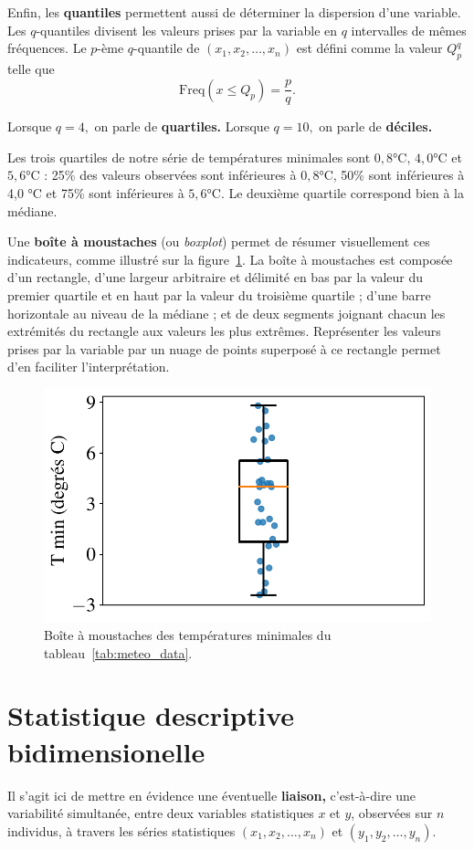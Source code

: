 Enfin, les \textbf{quantiles} permettent aussi de déterminer la dispersion
d'une variable. Les $q$-quantiles divisent les valeurs prises par la variable
en $q$ intervalles de mêmes fréquences. Le $p$-ème $q$-quantile de
$(x_1, x_2, \dots, x_n)$ est défini comme la valeur $Q_p^q$ telle que 
\[\text{Freq}(x \leq Q_p) = \frac{p}{q}.\]

Lorsque $q=4,$ on parle de \textbf{quartiles.} Lorsque $q=10,$ on parle de
\textbf{déciles.}

\begin{exemple}
  Les trois quartiles de notre série de températures minimales sont
  $0,8 \si{\celsius}$, $4,0 \si{\celsius}$ et $5,6 \si{\celsius}$ : 25\% des
  valeurs observées sont inférieures à $0,8 \si{\celsius}$, 50\% sont inférieures
  à 4,0 \si{\celsius} et 75\% sont inférieures à $5,6 \si{\celsius}$. Le deuxième
  quartile correspond bien à la médiane.
\end{exemple}

Une \textbf{boîte à moustaches} (ou \textit{boxplot}) permet de résumer
visuellement ces indicateurs, comme illustré sur la
figure~\ref{fig:meteo_tmin_boxplot}. La boîte à moustaches est composée d'un
rectangle, d'une largeur arbitraire et délimité en bas par la valeur du premier
quartile et en haut par la valeur du troisième quartile ; d'une barre
horizontale au niveau de la médiane ; et de deux segments joignant chacun les
extrémités du rectangle aux valeurs les plus extrêmes. Représenter les valeurs
prises par la variable par un nuage de points superposé à ce rectangle permet
d'en faciliter l'interprétation.

\begin{figure}[h]
  \centering
  \includegraphics[width=.5\textwidth]{figures/stats/meteo_tmin_boxplot}
  \caption{Boîte à moustaches des températures minimales du
    tableau~\ref{tab:meteo_data}.}
  \label{fig:meteo_tmin_boxplot}
\end{figure}

\section{Statistique descriptive bidimensionelle}
Il s'agit ici de mettre en évidence une éventuelle \textbf{liaison,}
c'est-à-dire une variabilité simultanée, entre deux variables statistiques $x$
et $y$, observées sur $n$ individus, à travers les séries statistiques
$(x_1, x_2, \dots, x_n)$ et $(y_1, y_2, \dots, y_n).$

